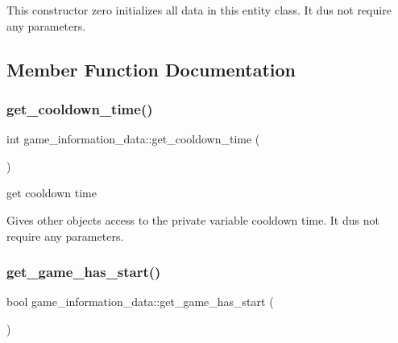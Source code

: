 This constructor zero initializes all data in this entity class. It dus not require any parameters. 

\subsection{Member Function Documentation}
\hypertarget{classgame__information__data_a534bcb8f2bec244ec6ab3eb200f4e301}{}\label{classgame__information__data_a534bcb8f2bec244ec6ab3eb200f4e301} 
\subsubsection{\texorpdfstring{get\+\_\+cooldown\+\_\+time()}{get\_cooldown\_time()}}
{\footnotesize\ttfamily int game\+\_\+information\+\_\+data\+::get\+\_\+cooldown\+\_\+time (\begin{DoxyParamCaption}{ }\end{DoxyParamCaption})\hspace{0.3cm}{\ttfamily [inline]}}



get cooldown time 

Gives other objects access to the private variable cooldown time. It dus not require any parameters. \hypertarget{classgame__information__data_a513ec296585aedfedfd917528f9f8fe6}{}\label{classgame__information__data_a513ec296585aedfedfd917528f9f8fe6} 
\subsubsection{\texorpdfstring{get\+\_\+game\+\_\+has\+\_\+start()}{get\_game\_has\_start()}}
{\footnotesize\ttfamily bool game\+\_\+information\+\_\+data\+::get\+\_\+game\+\_\+has\+\_\+start (\begin{DoxyParamCaption}{ }\end{DoxyParamCaption})\hspace{0.3cm}{\ttfamily [inline]}}



